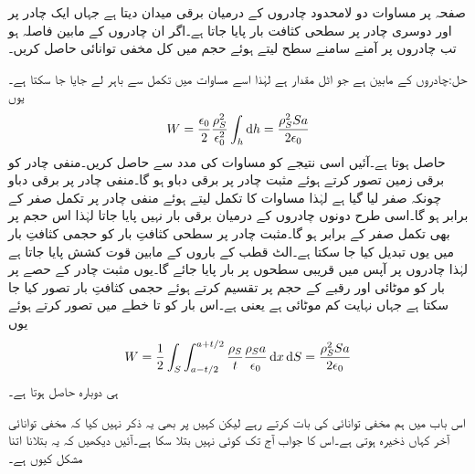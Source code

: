 صفحہ  پر مساوات  دو لامحدود چادروں کے درمیان برقی میدان دیتا ہے جہاں ایک چادر پر  اور دوسری چادر پر  سطحی کثافت بار پایا جاتا ہے۔اگر ان چادروں کے مابین فاصلہ  ہو تب چادروں پر آمنے سامنے  سطح لیتے ہوئے حجم    میں کل مخفی توانائی حاصل کریں۔

حل:چادروں کے مابین  ہے جو اٹل مقدار ہے  لہٰذا اسے مساوات  میں تکمل سے باہر لے جایا جا سکتا ہے۔یوں
\begin{align}\label{مساوات_توانائی_مخفی_توانائی_ذخیرہ_الف}
W=\frac{\epsilon_0}{2}\frac{\rho_S^2}{\epsilon_0^2} \int_h \dif h =\frac{\rho_S^2 S a}{2 \epsilon_0}
\end{align}
حاصل ہوتا ہے۔آئیں اسی نتیجے کو مساوات  کی مدد سے حاصل کریں۔منفی چادر کو برقی زمین تصور کرتے ہوئے مثبت چادر پر  برقی دباو ہو گا۔منفی چادر پر برقی دباو چونکہ صفر لیا گیا ہے لہٰذا مساوات  کا تکمل لیتے ہوئے منفی چادر پر تکمل صفر کے برابر ہو گا۔اسی طرح دونوں چادروں کے درمیان برقی بار نہیں پایا جاتا لہٰذا اس حجم  پر بھی تکمل صفر کے برابر ہو گا۔مثبت چادر پر سطحی کثافتِ بار کو حجمی کثافتِ بار میں یوں تبدیل کیا جا سکتا ہے۔الٹ قطب کے باروں کے مابین قوت کشش پایا جاتا ہے لہٰذا چادروں پر آپس میں قریبی سطحوں پر بار پایا جائے گا۔یوں مثبت چادر  کے  حصے پر بار  کو  موٹائی اور  رقبے کے حجم  پر تقسیم کرتے ہوئے  حجمی کثافتِ بار تصور کیا جا سکتا ہے جہاں  نہایت کم موٹائی ہے یعنی  ہے۔اس بار کو  تا  خطے میں تصور کرتے ہوئے یوں
\begin{align}\label{مساوات_توانائی_مخفی_توانائی_ذخیرہ_ب}
W=\frac{1}{2}\int_S \int_{a-t/2}^{a+t/2} \frac{\rho_S}{t} \frac{\rho_S a}{\epsilon_0} \dif x \dif S=\frac{\rho_S^2 S a}{2 \epsilon_0}
\end{align}
ہی دوبارہ حاصل ہوتا ہے۔

اس باب میں ہم مخفی توانائی کی بات کرتے رہے لیکن کہیں پر بھی یہ ذکر نہیں کیا کہ مخفی توانائی آخر کہاں  ذخیرہ ہوتی ہے۔اس کا جواب آج تک کوئی نہیں بتلا سکا ہے۔آئیں دیکھیں کہ یہ بتلانا اتنا مشکل کیوں ہے۔

